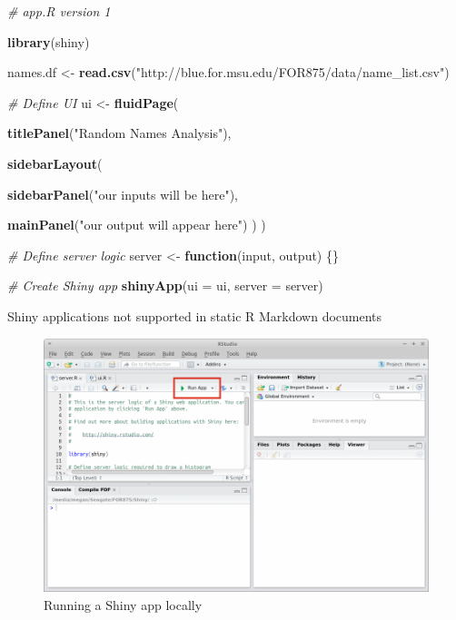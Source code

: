 \documentclass[]{krantz}
\makeatletter
\newenvironment{Shaded}{\begin{snugshade}}{\end{snugshade}}
\newcommand{\CommentTok}[1]{\textcolor[rgb]{0.37,0.37,0.37}{\textit{#1}}}
\newcommand{\ControlFlowTok}[1]{\textcolor[rgb]{0.27,0.27,0.27}{\textbf{#1}}}
\newcommand{\DataTypeTok}[1]{\textcolor[rgb]{0.27,0.27,0.27}{#1}}
\newcommand{\KeywordTok}[1]{\textcolor[rgb]{0.27,0.27,0.27}{\textbf{#1}}}
\newcommand{\NormalTok}[1]{#1}
\newcommand{\StringTok}[1]{\textcolor[rgb]{0.5,0.5,0.5}{#1}}
\newenvironment{kframe}{%
\medskip{}
\setlength{\fboxsep}{.8em}
 \def\at@end@of@kframe{}%
 \ifinner\ifhmode%
  \def\at@end@of@kframe{\end{minipage}}%
  \begin{minipage}{\columnwidth}%
 \fi\fi%
 \def\FrameCommand##1{\hskip\@totalleftmargin \hskip-\fboxsep
 \colorbox{shadecolor}{##1}\hskip-\fboxsep
     \hskip-\linewidth \hskip-\@totalleftmargin \hskip\columnwidth}%
 \MakeFramed {\advance\hsize-\width
   \@totalleftmargin\z@ \linewidth\hsize
   \@setminipage}}%
 {\par\unskip\endMakeFramed%
 \at@end@of@kframe}
\renewenvironment{Shaded}{\begin{kframe}}{\end{kframe}}
\makeatother
\begin{document}
\begin{Shaded}
\begin{Highlighting}[]
\CommentTok{# app.R version 1}

\KeywordTok{library}\NormalTok{(shiny)}

\NormalTok{names.df <-}\StringTok{ }\KeywordTok{read.csv}\NormalTok{(}\StringTok{"http://blue.for.msu.edu/FOR875/data/name_list.csv"}\NormalTok{)}

\CommentTok{# Define UI}
\NormalTok{ui <-}\StringTok{ }\KeywordTok{fluidPage}\NormalTok{(}
  
  \KeywordTok{titlePanel}\NormalTok{(}\StringTok{"Random Names Analysis"}\NormalTok{),}
  
  \KeywordTok{sidebarLayout}\NormalTok{(}
    
    \KeywordTok{sidebarPanel}\NormalTok{(}\StringTok{"our inputs will be here"}\NormalTok{),}
    
    \KeywordTok{mainPanel}\NormalTok{(}\StringTok{"our output will appear here"}\NormalTok{)}
\NormalTok{  )}
\NormalTok{)}

\CommentTok{# Define server logic}
\NormalTok{server <-}\StringTok{ }\ControlFlowTok{function}\NormalTok{(input, output) \{\}}

\CommentTok{# Create Shiny app}
\KeywordTok{shinyApp}\NormalTok{(}\DataTypeTok{ui =}\NormalTok{ ui, }\DataTypeTok{server =}\NormalTok{ server)}
\end{Highlighting}
\end{Shaded}

Shiny applications not supported in static R Markdown documents

\begin{figure}
\includegraphics[width=13.14in]{../figures/RStudio_runApp} \caption{Running a Shiny app locally}\label{fig:fig1}
\end{figure}
\end{document}
